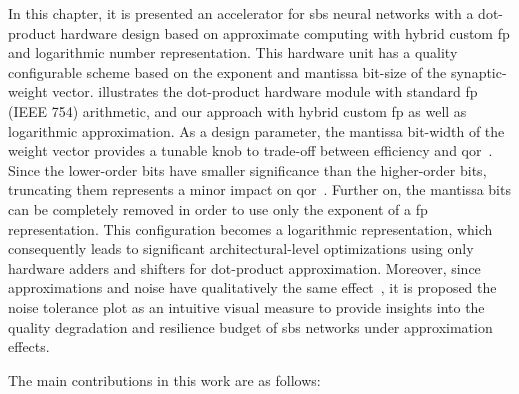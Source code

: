 In this chapter, it is presented an accelerator for \gls{sbs} neural networks with a dot-product hardware design based on approximate computing with hybrid custom \gls{fp}  and logarithmic number representation. This hardware unit has a quality configurable scheme based on the exponent and mantissa bit-size of the synaptic-weight vector.  illustrates the dot-product hardware module with standard \gls{fp} (IEEE 754) arithmetic, and our approach with hybrid custom \gls{fp}  as well as logarithmic approximation. As a design parameter, the mantissa bit-width of the weight vector provides a tunable knob to trade-off between efficiency and \gls{qor}~\cite{park2009dynamic, han2013approximate}. Since the lower-order bits have smaller significance than the higher-order bits, truncating them represents a minor impact on \gls{qor}~\cite{gupta2011impact, mittal2016survey}. Further on, the mantissa bits can be completely removed in order to use only the exponent of a \gls{fp} representation. This configuration becomes a logarithmic representation, which consequently leads to significant architectural-level optimizations using only hardware adders and shifters for dot-product approximation. Moreover, since approximations and noise have qualitatively the same effect~\cite{venkataramani2015approximate}, it is proposed the noise tolerance plot as an intuitive visual measure to provide insights into the quality degradation and resilience budget of \gls{sbs} networks under approximation effects.

The main contributions in this work are as follows:


